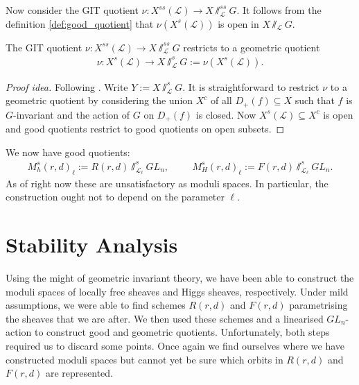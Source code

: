 \documentclass[12pt]{ociamthesis}  %
\begin{document}
Now consider the GIT quotient $\nu : X^{ss}(\mathscr L)\to X\sslash^{ss}_{\mathscr L} G$.
It follows from the definition \ref{def:good_quotient} that
$\nu(X^s(\mathscr L))$ is open in $X\sslash_{\mathscr L} G$.

\begin{theorem}
  The GIT quotient $\nu : X^{ss}({\mathscr L}) \to X\sslash^{ss}_{\mathscr L} G$
  restricts to a geometric quotient
  \begin{align*}
    \nu : X^s({\mathscr L}) \to X\sslash^s_{\mathscr L} G := \nu(X^s({\mathscr L})).
  \end{align*}
  \begin{proof}[Proof idea]
    Following \cite[Theorem 5.6]{hoskins2016}. Write
    $Y := X\sslash^s_{\mathscr L}G$. It is straightforward to
    restrict $\nu$ to a geometric quotient by considering the
    union $X^c$ of all $D_+(f)\subseteq X$ such that $f$ is $G$-invariant
    and the action of $G$ on $D_+(f)$ is closed. Now
    $X^s(\mathscr L)\subseteq X^c$ is open and good quotients restrict
    to good quotients on open subsets.
  \end{proof}
\end{theorem}

\begin{example}
  We now have good quotients:
  \begin{align*}
    M^{s}_h(r,d)_\ell := R(r,d)\sslash^s_{\mathscr L_\ell} GL_n, \hspace{1cm}
    M^{s}_H(r,d)_\ell := F(r,d)\sslash^s_{\mathscr L_\ell} GL_n.
  \end{align*}
  As of right now these are unsatisfactory as moduli spaces. In particular,
  the construction ought not to depend on the parameter $\ell$.
\end{example}


\section{Stability Analysis}

Using the might of geometric invariant theory, we have been able
to construct the moduli spaces of locally free sheaves and Higgs
sheaves, respectively. Under mild assumptions, we were able to
find schemes $R(r,d)$ and $F(r,d)$ parametrising the sheaves
that we are after. We then used these schemes and a linearised
$GL_n$-action to construct good and geometric quotients.
Unfortunately, both steps required us to discard some points.
Once again we find ourselves where we have constructed moduli spaces
but cannot yet be sure which orbits in $R(r,d)$ and $F(r,d)$
are represented.
\end{document}

